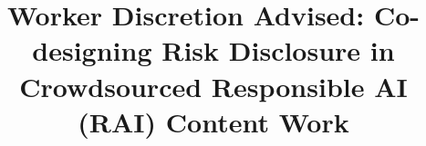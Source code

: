 \documentclass[manuscript, review, anonymous]{acmart}
\begin{document}
\renewcommand{\shortauthors}{Alice Qian Zhang, et al.}






\title{Worker Discretion Advised: Co-designing Risk Disclosure in Crowdsourced Responsible AI (RAI) Content Work}

\maketitle














% 
\end{document}
